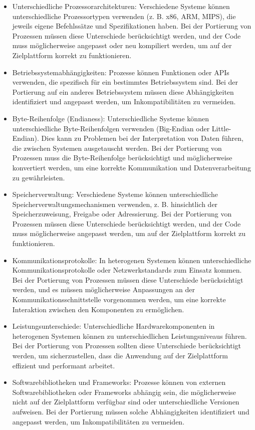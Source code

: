 \begin{itemize}
\item Unterschiedliche Prozessorarchitekturen: Verschiedene Systeme können unterschiedliche Prozessortypen verwenden (z. B. x86, ARM, MIPS), die jeweils eigene Befehlssätze und Spezifikationen haben. Bei der Portierung von Prozessen müssen diese Unterschiede berücksichtigt werden, und der Code muss möglicherweise angepasst oder neu kompiliert werden, um auf der Zielplattform korrekt zu funktionieren.
\item Betriebssystemabhängigkeiten: Prozesse können Funktionen oder APIs verwenden, die spezifisch für ein bestimmtes Betriebssystem sind. Bei der Portierung auf ein anderes Betriebssystem müssen diese Abhängigkeiten identifiziert und angepasst werden, um Inkompatibilitäten zu vermeiden.
\item Byte-Reihenfolge (Endianess): Unterschiedliche Systeme können unterschiedliche Byte-Reihenfolgen verwenden (Big-Endian oder Little-Endian). Dies kann zu Problemen bei der Interpretation von Daten führen, die zwischen Systemen ausgetauscht werden. Bei der Portierung von Prozessen muss die Byte-Reihenfolge berücksichtigt und möglicherweise konvertiert werden, um eine korrekte Kommunikation und Datenverarbeitung zu gewährleisten.
\item Speicherverwaltung: Verschiedene Systeme können unterschiedliche Speicherverwaltungsmechanismen verwenden, z. B. hinsichtlich der Speicherzuweisung, Freigabe oder Adressierung. Bei der Portierung von Prozessen müssen diese Unterschiede berücksichtigt werden, und der Code muss möglicherweise angepasst werden, um auf der Zielplattform korrekt zu funktionieren.
\item Kommunikationsprotokolle: In heterogenen Systemen können unterschiedliche Kommunikationsprotokolle oder Netzwerkstandards zum Einsatz kommen. Bei der Portierung von Prozessen müssen diese Unterschiede berücksichtigt werden, und es müssen möglicherweise Anpassungen an der Kommunikationsschnittstelle vorgenommen werden, um eine korrekte Interaktion zwischen den Komponenten zu ermöglichen.
\item Leistungsunterschiede: Unterschiedliche Hardwarekomponenten in heterogenen Systemen können zu unterschiedlichen Leistungsniveaus führen. Bei der Portierung von Prozessen sollten diese Unterschiede berücksichtigt werden, um sicherzustellen, dass die Anwendung auf der Zielplattform effizient und performant arbeitet.
\item Softwarebibliotheken und Frameworks: Prozesse können von externen Softwarebibliotheken oder Frameworks abhängig sein, die möglicherweise nicht auf der Zielplattform verfügbar sind oder unterschiedliche Versionen aufweisen. Bei der Portierung müssen solche Abhängigkeiten identifiziert und angepasst werden, um Inkompatibilitäten zu vermeiden.
\end{itemize}
